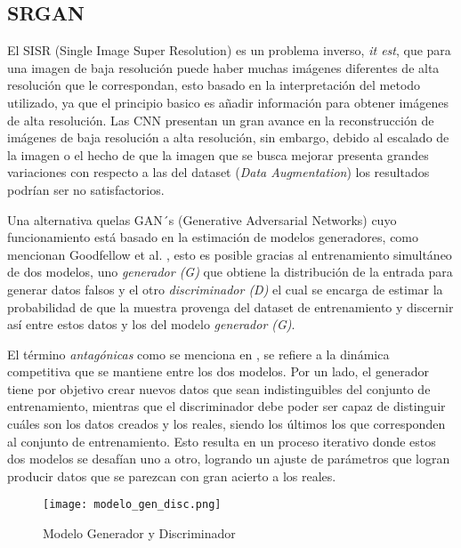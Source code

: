 \subsection{SRGAN}

El SISR (Single Image Super Resolution) es un problema inverso, \emph{it est}, que para una imagen de baja resolución puede haber muchas
imágenes diferentes de alta resolución que le correspondan, esto basado en la interpretación del metodo utilizado, ya que
el principio basico es añadir información para obtener imágenes de alta resolución.
Las CNN presentan un gran avance en la reconstrucción de imágenes de baja resolución a alta resolución,
sin embargo, debido al escalado de la imagen o el hecho de que la imagen que se busca mejorar presenta grandes
variaciones con respecto a las del dataset (\emph{Data Augmentation}) los resultados podrían ser no satisfactorios.


Una alternativa quelas GAN´s (Generative Adversarial Networks) cuyo funcionamiento está basado
en la estimación de modelos generadores, como mencionan Goodfellow et al. \cite{GANs}, esto es 
posible gracias al entrenamiento simultáneo de dos modelos, uno \emph{generador (G)} que obtiene 
la distribución de la entrada para generar datos falsos y el otro \emph{discriminador (D)} el cual se encarga de estimar 
la probabilidad de que la muestra provenga del dataset de entrenamiento y discernir así entre estos datos y 
los del modelo \emph{ generador (G)}.

El término \emph{antagónicas} como se menciona en \cite{SRGAN_Tesis}, se refiere a la dinámica 
competitiva que se mantiene entre los dos modelos. Por un lado,
el generador tiene por objetivo crear nuevos datos que sean indistinguibles del
conjunto de entrenamiento, mientras que el discriminador debe poder ser capaz
de distinguir cuáles son los datos creados y los reales, siendo los últimos los que corresponden
 al conjunto de entrenamiento. Esto resulta en un proceso iterativo donde estos dos modelos
 se desafían uno a otro, logrando un ajuste de parámetros
 que logran producir datos que se parezcan con gran acierto a los reales.
 

\begin{figure}[H]
    \begin{center}
      \texttt{[image: modelo\_gen\_disc.png]}
      \caption{Modelo Generador y Discriminador}
      \label{Alexis1}
    \end{center}
\end{figure}

